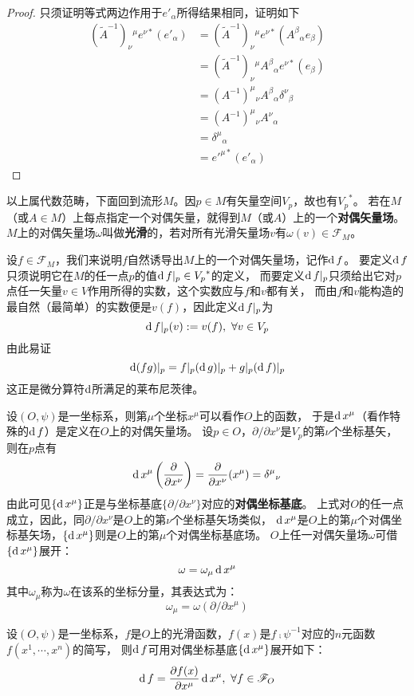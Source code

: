 \begin{proof}
只须证明等式两边作用于$e'_\alpha$所得结果相同，证明如下
$$\begin{aligned}
(\tilde{A}^{-1})_\nu{}^\mu e^{\nu*}(e'_\alpha) & = (\tilde{A}^{-1})_\nu{}^\mu e^{\nu*}(A^\beta{}_\alpha e_\beta) \\
& = (\tilde{A}^{-1})_\nu{}^\mu A^\beta{}_\alpha e^{\nu*}(e_\beta) \\
& = (A^{-1})^\mu{}_\nu A^\beta{}_\alpha \delta^{\nu}{}_\beta \\
& = (A^{-1})^\mu{}_\nu A^\nu{}_\alpha \\
& = \delta^\mu{}_\alpha \\
& = e'^{\mu*}(e'_\alpha)
\end{aligned}$$
\end{proof}

以上属代数范畴，下面回到流形$M$。因$p \in M$有矢量空间$V_p$，故也有${V_p}^*$。
若在$M$（或$A \in M$）上每点指定一个对偶矢量，就得到$M$（或$A$）上的一个\textbf{对偶矢量场}。
$M$上的对偶矢量场$\omega$叫做\textbf{光滑}的，若对所有光滑矢量场$v$有$\omega(v) \in \mathscr{F}_M$。

设$f \in \mathscr{F}_M$，我们来说明$f$自然诱导出$M$上的一个对偶矢量场，记作$\operatorname{d} f$。
要定义$\operatorname{d} f$只须说明它在$M$的任一点$p$的值$\operatorname{d} f|_p \in {V_p}^*$的定义，
而要定义$\operatorname{d} f|_p$只须给出它对$p$点任一矢量$v \in V$作用所得的实数，这个实数应与$f$和$v$都有关，
而由$f$和$v$能构造的最自然（最简单）的实数便是$v(f)$，因此定义$\operatorname{d} f|_p$为
$$\operatorname{d} f|_p(v) := v(f), ~ \forall v \in V_p$$
由此易证
$$\operatorname{d} (fg)|_p = f|_p(\operatorname{d} g)|_p + g|_p(\operatorname{d} f)|_p$$
这正是微分算符$\operatorname{d}$所满足的莱布尼茨律。

设$(O, \psi)$是一坐标系，则第$\mu$个坐标$x^\mu$可以看作$O$上的函数，
于是$\operatorname{d} x^\mu$（看作特殊的$\operatorname{d} f$）是定义在$O$上的对偶矢量场。
设$p \in O$，$\partial / \partial x^\nu$是$V_p$的第$\nu$个坐标基矢，
则在$p$点有$$\operatorname{d} x^\mu\left(\frac{\partial}{\partial x^\nu}\right) = \frac{\partial}{\partial x^\nu}(x^\mu) = \delta^\mu{}_\nu$$
由此可见$\{\operatorname{d} x^\mu\}$正是与坐标基底$\{\partial / \partial x^\nu\}$对应的\textbf{对偶坐标基底}。
上式对$O$的任一点成立，因此，同$\partial / \partial x^\nu$是$O$上的第$\nu$个坐标基矢场类似，
$\operatorname{d} x^\mu$是$O$上的第$\mu$个对偶坐标基矢场，$\{\operatorname{d} x^\mu\}$则是$O$上的第$\mu$个对偶坐标基底场。
$O$上任一对偶矢量场$\omega$可借$\{\operatorname{d} x^\mu\}$展开：$$\omega = \omega_\mu\operatorname{d} x^\mu$$
其中$\omega_\mu$称为$\omega$在该系的坐标分量，其表达式为：$$\omega_\mu = \omega(\partial / \partial x^\mu)$$

\begin{theorem}
设$(O, \psi)$是一坐标系，$f$是$O$上的光滑函数，$f(x)$是$f \comp \psi^{-1}$对应的$n$元函数$f(x^1, \cdots, x^n)$的简写，
则$\operatorname{d} f$可用对偶坐标基底$\{\operatorname{d} x^\mu\}$展开如下：
$$\operatorname{d} f = \frac{\partial f(x)}{\partial x^\mu}\operatorname{d} x^\mu, ~ \forall f \in \mathscr{F}_O$$
\end{theorem}

